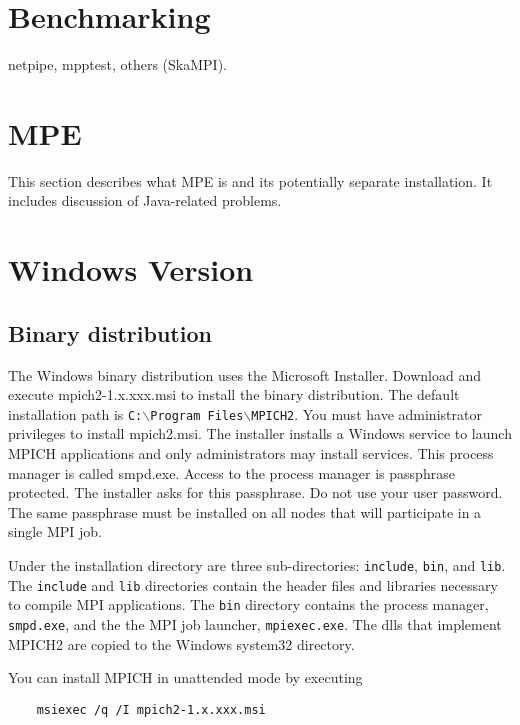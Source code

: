 \documentclass[dvipdfm,11pt]{article}
\begin{document}
\section{Benchmarking}
\label{sec:benchmarking}
netpipe, mpptest, others (SkaMPI).

\section{MPE}
\label{sec:mpe}

This section describes what MPE is and its potentially separate installation.  It
includes discussion of Java-related problems.

\section{Windows Version}
\label{sec:windows}

\subsection{Binary distribution}
\label{sec:winbin}

The Windows binary distribution uses the Microsoft Installer.  Download and 
execute mpich2-1.x.xxx.msi to install the binary distribution.  The default 
installation path is \texttt{C:$\backslash$Program Files$\backslash$MPICH2}. 
You must have administrator privileges to install mpich2.msi.  The installer 
installs a Windows service to launch MPICH applications and only administrators
may install services.  This process manager is called smpd.exe.  Access to 
the process manager is passphrase protected.  The installer asks for this 
passphrase.  Do not use your user password.  The same passphrase must be 
installed on all nodes that will participate in a single MPI job.

Under the installation directory are three sub-directories: \texttt{include},
 \texttt{bin}, and \texttt{lib}.  The \texttt{include} and \texttt{lib} 
directories contain the header files and libraries necessary to compile MPI 
applications.  The \texttt{bin} directory contains the process manager, 
\texttt{smpd.exe}, and the the MPI job launcher, \texttt{mpiexec.exe}.  The
dlls that implement MPICH2 are copied to the Windows system32 directory.

You can install MPICH in unattended mode by executing 
\begin{verbatim}
    msiexec /q /I mpich2-1.x.xxx.msi
\end{verbatim}
\end{document}
